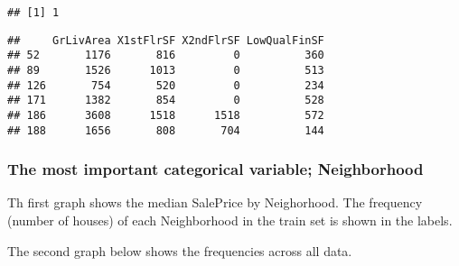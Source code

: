 \documentclass[]{article}
\newenvironment{Shaded}{\begin{snugshade}}{\end{snugshade}}
\newcommand{\KeywordTok}[1]{\textcolor[rgb]{0.13,0.29,0.53}{\textbf{#1}}}
\newcommand{\DecValTok}[1]{\textcolor[rgb]{0.00,0.00,0.81}{#1}}
\newcommand{\StringTok}[1]{\textcolor[rgb]{0.31,0.60,0.02}{#1}}
\newcommand{\OperatorTok}[1]{\textcolor[rgb]{0.81,0.36,0.00}{\textbf{#1}}}
\newcommand{\NormalTok}[1]{#1}
\begin{document}
\begin{Shaded}
\end{Shaded}

\begin{verbatim}
## [1] 1
\end{verbatim}

\begin{Shaded}
\end{Shaded}

\begin{verbatim}
##     GrLivArea X1stFlrSF X2ndFlrSF LowQualFinSF
## 52       1176       816         0          360
## 89       1526      1013         0          513
## 126       754       520         0          234
## 171      1382       854         0          528
## 186      3608      1518      1518          572
## 188      1656       808       704          144
\end{verbatim}

\subsubsection{The most important categorical variable;
Neighborhood}\label{the-most-important-categorical-variable-neighborhood}

Th first graph shows the median SalePrice by Neighorhood. The frequency
(number of houses) of each Neighborhood in the train set is shown in the
labels.

The second graph below shows the frequencies across all data.
\end{document}
